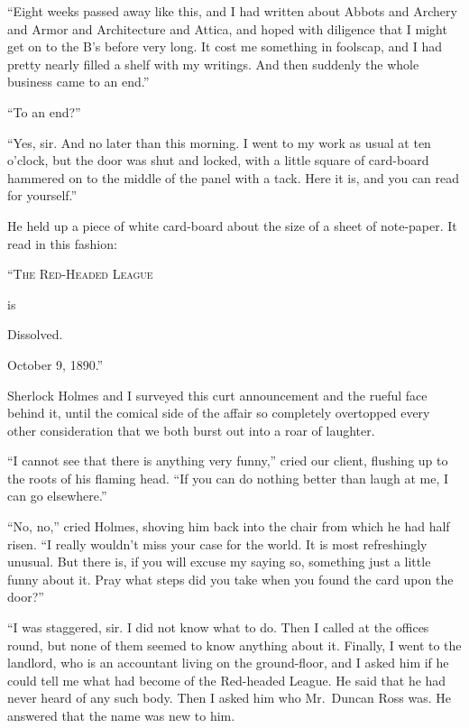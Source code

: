“Eight weeks passed away like this, and I had written
about Abbots and Archery and Armor and Architecture and
Attica, and hoped with diligence that I might get on to the
B’s before very long. It cost me something in foolscap, and I
had pretty nearly filled a shelf with my writings. And then
suddenly the whole business came to an end.”

“To an end?”

“Yes, sir. And no later than this morning. I went to my
work as usual at ten o’clock, but the door was shut and
locked, with a little square of card-board hammered on to the
middle of the panel with a tack. Here it is, and you can read
for yourself.”

He held up a piece of white card-board about the size of a
sheet of note-paper. It read in this fashion:

\begin{center}
\scshape “The Red-Headed League

is

Dissolved.
\end{center}
\begin{flushright}
October 9, 1890.”\hspace*{3em}
\end{flushright}

Sherlock Holmes and I surveyed this curt announcement
and the rueful face behind it, until the comical side of the
affair so completely overtopped every other consideration
that we both burst out into a roar of laughter.

“I cannot see that there is anything very funny,” cried
our client, flushing up to the roots of his flaming head. “If
you can do nothing better than laugh at me, I can go elsewhere.”

“No, no,” cried Holmes, shoving him back into the chair
from which he had half risen. “I really wouldn’t miss your
case for the world. It is most refreshingly unusual. But
there is, if you will excuse my saying so, something just a
little funny about it. Pray what steps did you take when
you found the card upon the door?”

“I was staggered, sir. I did not know what to do. Then
I called at the offices round, but none of them seemed to
know anything about it. Finally, I went to the landlord, who
is an accountant living on the ground-floor, and I asked him
if he could tell me what had become of the Red-headed
League. He said that he had never heard of any such body.
Then I asked him who Mr.~Duncan Ross was. He answered
that the name was new to him.

